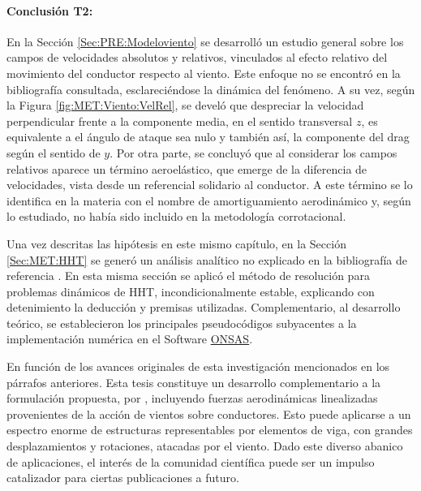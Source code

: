 \paragraph{Conclusión T2:}
En la Sección \ref{Sec:PRE:Modeloviento} se desarrolló un estudio general sobre los campos de velocidades absolutos y relativos, vinculados al efecto relativo del movimiento del conductor respecto al viento. Este enfoque no se encontró en la bibliografía consultada, esclareciéndose la dinámica del fenómeno. A su vez, según la Figura \ref{fig:MET:Viento:VelRel}, se develó que despreciar la velocidad perpendicular frente a la componente media, en el sentido transversal $z$,  es equivalente a el ángulo de ataque sea nulo y también así, la componente del drag según el sentido de $y$. Por otra parte, se concluyó que al considerar los campos relativos aparece un término aeroelástico, que emerge de la diferencia de velocidades, vista desde un referencial solidario al conductor. A este término se lo identifica en la materia con el nombre de amortiguamiento aerodinámico y, según lo estudiado, no había sido incluido en la metodología corrotacional. 

Una vez descritas las hipótesis en este mismo capítulo, en la Sección \ref{Sec:MET:HHT} se generó un análisis analítico no explicado en la bibliografía de referencia \citep{Le2014}. En esta misma sección se aplicó el método de resolución para problemas dinámicos de HHT, incondicionalmente estable, explicando con detenimiento la deducción y premisas utilizadas. Complementario, al desarrollo teórico, se establecieron los principales pseudocódigos subyacentes a la implementación numérica en el Software \href{https://github.com/ONSAS/ONSAS.m/}{ONSAS}.

En función de los avances originales de esta investigación mencionados en los párrafos anteriores. Esta tesis constituye un desarrollo complementario a la formulación propuesta, por \cite{Le2014}, incluyendo fuerzas aerodinámicas linealizadas provenientes de la acción de vientos sobre conductores. Esto puede aplicarse a un espectro enorme de estructuras representables por elementos de viga, con grandes desplazamientos y rotaciones, atacadas por el viento. Dado este diverso abanico de aplicaciones, el interés de la comunidad científica puede ser un impulso catalizador para ciertas publicaciones a futuro.

